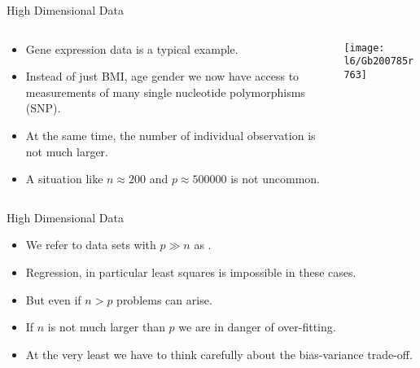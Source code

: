 \documentclass[mathserif, aspectratio=169]{beamer}
\begin{document}
\begin{frame}{High Dimensional Data}
	\begin{columns}
		\begin{column}{0.5\textwidth}
			\begin{itemize}
				\item Gene expression data is a typical example.
				\item Instead of just BMI, age gender we now have
					access to measurements of many single nucleotide polymorphisms (SNP).
				\item At the same time, the number of individual observation
					is not much larger.
				\item A situation like $n\approx 200$ and $p \approx 500000$ is not uncommon.
			\end{itemize}
		\end{column}
		\begin{column}{0.5\textwidth}
			\texttt{[image: l6/Gb200785r763]}
		\end{column}
	\end{columns}
\end{frame}

\begin{frame}{High Dimensional Data}
	\begin{itemize}
		\item We refer to data sets with $p \gg n$ as .
		\item Regression, in particular least squares is impossible in these cases.
		\item But even if $n > p$ problems can arise.
		\item If $n$ is not much larger than $p$ we are in danger of over-fitting.
		\item At the very least we have to think carefully about the bias-variance trade-off.

	\end{itemize}
\end{frame}
\end{document}
